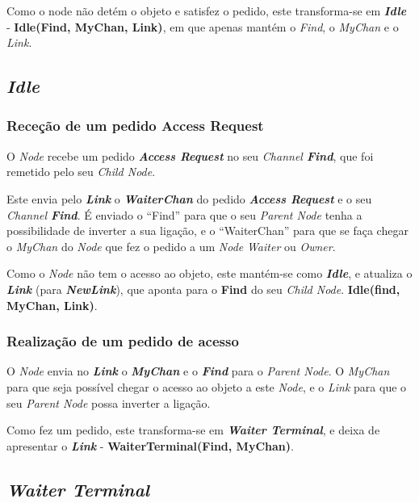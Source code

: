 Como o node não detém o objeto e satisfez o pedido, este transforma-se em \emph{\textbf{Idle}} - \textbf{Idle(Find, MyChan, Link)}, em que apenas
mantém o \emph{Find}, o \emph{MyChan} e o \emph{Link}.





\subsection*{\emph{Idle}}
\label{especificacao:nodes:idle}


\subsubsection*{Receção de um pedido Access Request}
O \emph{Node} recebe um pedido \emph{\textbf{Access Request}} no seu \emph{Channel \textbf{Find}}, que foi remetido pelo seu \emph{Child Node}.

Este envia pelo \textbf{\emph{Link}} o \textbf{\emph{WaiterChan}} do pedido \emph{\textbf{Access Request}} e o seu \emph{Channel \textbf{Find}}.
É enviado o ``Find'' para que o seu \emph{Parent Node} tenha a possibilidade de inverter a sua ligação, 
e o ``WaiterChan'' para que se faça chegar o \emph{MyChan} do \emph{Node} que fez o pedido a um \emph{Node} \emph{Waiter} ou \emph{Owner}.

Como o \emph{Node} não tem o acesso ao objeto, este mantém-se como \emph{\textbf{Idle}}, e atualiza o \textbf{\emph{Link}} (para \textbf{\emph{NewLink}}), que aponta para o \textbf{Find} do seu \emph{Child Node}.
\textbf{Idle(find, MyChan, Link)}.



\subsubsection*{Realização de um pedido de acesso}
O \emph{Node} envia no \textbf{\emph{Link}} o \textbf{\emph{MyChan}} e o \textbf{\emph{Find}} para o \emph{Parent Node}.
O \emph{MyChan} para que seja possível chegar o acesso ao objeto a este \emph{Node}, e o \emph{Link} para que o seu \emph{Parent Node} possa inverter a ligação.

Como fez um pedido, este transforma-se em \emph{\textbf{Waiter Terminal}}, e deixa de apresentar o \textbf{\emph{Link}} - \textbf{WaiterTerminal(Find, MyChan)}.

\subsection*{\emph{Waiter Terminal}}
\label{especificacao:nodes:waiter_terminal}


